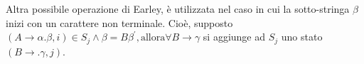 \documentclass{subfiles}
\begin{document}
Altra possibile operazione di Earley, è utilizzata nel caso in cui la sotto-stringa $\beta$ inizi con un carattere non terminale.
Cioè, supposto $(A \to \alpha . \beta , i) \in S_{j} \land \beta = B\beta^{'}, \text{allora} \forall B \to \gamma$ si aggiunge ad $S_{j}$
uno stato $(B \to .\gamma, j)$.
\end{document}
